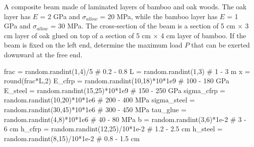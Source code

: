 \documentclass[
10pt,
a4paper,
openany,
svgnames,
]{kaobook} %
\begin{document}
\begin{exercises}
\item A composite beam made of laminated layers of bamboo and oak woods. The oak layer has $E$ = 2 GPa and $\sigma_{allow}$ = 20 MPa, while the bamboo layer has $E$ = 1 GPa and $\sigma_{allow}$ = 30 MPa. The cross-section of the beam is a section of 5 cm $\times$ 3 cm layer of oak glued on top of a section of 5 cm $\times$ 4 cm layer of bamboo. If the beam is fixed on the left end, determine the maximum load $P$ that can be exerted downward at the free end.

  \begin{figure}[h]
    \centering
  \end{figure}

\begin{pycode}
  frac = random.randint(1,4)/5 # 0.2 - 0.8
  L = random.randint(1,3) # 1 - 3 m
  x = round(frac*L,2)
  E_cfrp = random.randint(10,18)*10*1e9 # 100 - 180 GPa
  E_steel = random.randint(15,25)*10*1e9 # 150 - 250 GPa
  sigma_cfrp = random.randint(10,20)*10*1e6 # 200 - 400 MPa
  sigma_steel = random.randint(30,45)*10*1e6 # 300 - 450 MPa
  tau_glue = random.randint(4,8)*10*1e6 # 40 - 80 MPa
  b = random.randint(3,6)*1e-2 # 3 - 6 cm
  h_cfrp =  random.randint(12,25)/10*1e-2 # 1.2 - 2.5 cm
  h_steel =  random.randint(8,15)/10*1e-2 # 0.8 - 1.5 cm
\end{pycode}


\end{exercises}
\end{document}
